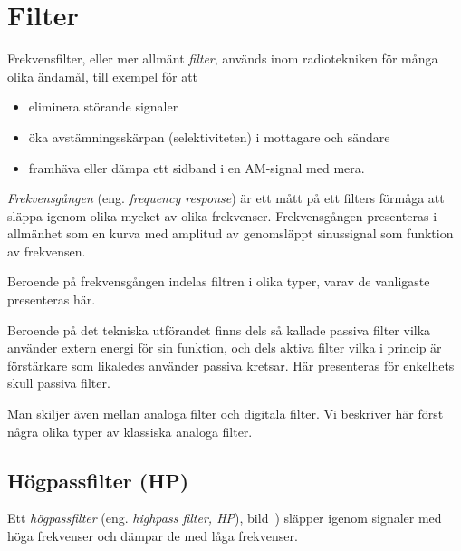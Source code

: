 \section{Filter}
\label{filter}

Frekvensfilter, eller mer allmänt \emph{filter}, används inom radiotekniken för
många olika ändamål, till exempel för att
\begin{itemize}
  \item eliminera störande signaler
  \item öka avstämningsskärpan (selektiviteten) i mottagare och sändare
  \item framhäva eller dämpa ett sidband i en AM-signal med mera.
\end{itemize}

\emph{Frekvensgången} (eng. \emph{frequency response}) är ett mått på ett
filters förmåga att släppa igenom olika mycket av olika frekvenser.
Frekvensgången presenteras i allmänhet som en kurva med amplitud av genomsläppt
sinussignal som funktion av frekvensen.

Beroende på frekvensgången indelas filtren i olika typer, varav de vanligaste
presenteras här.

Beroende på det tekniska utförandet finns dels så kallade passiva filter vilka
använder extern energi för sin funktion, och dels aktiva filter vilka i princip
är förstärkare som likaledes använder passiva kretsar.
Här presenteras för enkelhets skull passiva filter.

Man skiljer även mellan analoga filter och digitala filter.
Vi beskriver här först några olika typer av klassiska analoga filter.

\subsection{Högpassfilter (HP)}



Ett \emph{högpassfilter} (eng. \emph{highpass filter, HP}),
bild~) släpper igenom signaler med höga frekvenser och
dämpar de med låga frekvenser.

